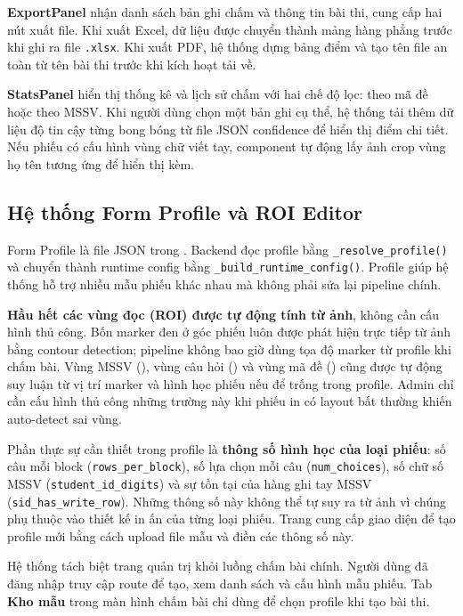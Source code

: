 \textbf{ExportPanel} nhận danh sách bản ghi chấm và thông tin bài thi, cung cấp hai nút xuất file. Khi xuất Excel, dữ liệu được chuyển thành mảng hàng phẳng trước khi ghi ra file \texttt{.xlsx}. Khi xuất PDF, hệ thống dựng bảng điểm và tạo tên file an toàn từ tên bài thi trước khi kích hoạt tải về.

\textbf{StatsPanel} hiển thị thống kê và lịch sử chấm với hai chế độ lọc: theo mã đề hoặc theo MSSV. Khi người dùng chọn một bản ghi cụ thể, hệ thống tải thêm dữ liệu độ tin cậy từng bong bóng từ file JSON confidence để hiển thị điểm chi tiết. Nếu phiếu có cấu hình vùng chữ viết tay, component tự động lấy ảnh crop vùng họ tên tương ứng để hiển thị kèm.

\subsection{Hệ thống Form Profile và ROI Editor}

Form Profile là file JSON trong . Backend đọc profile bằng \texttt{\_resolve\_profile()} và chuyển thành runtime config bằng \texttt{\_build\_runtime\_config()}. Profile giúp hệ thống hỗ trợ nhiều mẫu phiếu khác nhau mà không phải sửa lại pipeline chính.

\textbf{Hầu hết các vùng đọc (ROI) được tự động tính từ ảnh}, không cần cấu hình thủ công. Bốn marker đen ở góc phiếu luôn được phát hiện trực tiếp từ ảnh bằng contour detection; pipeline không bao giờ dùng tọa độ marker từ profile khi chấm bài. Vùng MSSV (), vùng câu hỏi () và vùng mã đề () cũng được tự động suy luận từ vị trí marker và hình học phiếu nếu để trống trong profile. Admin chỉ cần cấu hình thủ công những trường này khi phiếu in có layout bất thường khiến auto-detect sai vùng.

Phần thực sự cần thiết trong profile là \textbf{thông số hình học của loại phiếu}: số câu mỗi block (\texttt{rows\_per\_block}), số lựa chọn mỗi câu (\texttt{num\_choices}), số chữ số MSSV (\texttt{student\_id\_digits}) và sự tồn tại của hàng ghi tay MSSV (\texttt{sid\_has\_write\_row}). Những thông số này không thể tự suy ra từ ảnh vì chúng phụ thuộc vào thiết kế in ấn của từng loại phiếu. Trang  cung cấp giao diện để tạo profile mới bằng cách upload file mẫu và điền các thông số này.

Hệ thống tách biệt trang quản trị khỏi luồng chấm bài chính. Người dùng đã đăng nhập truy cập route  để tạo, xem danh sách và cấu hình mẫu phiếu. Tab \textbf{Kho mẫu} trong màn hình chấm bài chỉ dùng để chọn profile khi tạo bài thi.

